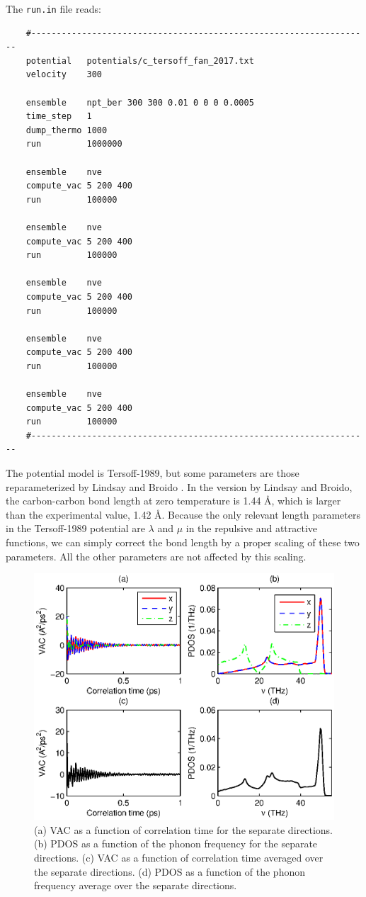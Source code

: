\documentclass[12pt,a4paper]{report}
\begin{document}
The \verb"run.in" file reads:
\begin{verbatim}
    #-------------------------------------------------------------------
    potential   potentials/c_tersoff_fan_2017.txt
    velocity    300

    ensemble    npt_ber 300 300 0.01 0 0 0 0.0005
    time_step   1
    dump_thermo 1000
    run         1000000

    ensemble    nve
    compute_vac 5 200 400
    run         100000

    ensemble    nve
    compute_vac 5 200 400
    run         100000

    ensemble    nve
    compute_vac 5 200 400
    run         100000

    ensemble    nve
    compute_vac 5 200 400
    run         100000

    ensemble    nve
    compute_vac 5 200 400
    run         100000
    #-------------------------------------------------------------------
\end{verbatim}

The potential model is Tersoff-1989, but some parameters are those reparameterized by Lindsay and Broido \cite{lindsay2010prb}. In the version by Lindsay and Broido, the carbon-carbon bond length at zero temperature is 1.44 \AA, which is larger than the experimental value, 1.42 \AA. Because the only relevant length parameters in the Tersoff-1989 potential are $\lambda$ and $\mu$ in the repulsive and attractive functions, we can simply correct the bond length by a proper scaling of these two parameters. All the other parameters are not affected by this scaling.

\begin{figure}[ht]
\begin{center}
\includegraphics[width=\columnwidth]{ex2.eps}
\caption{(a) VAC as a function of correlation time for the separate directions.
(b) PDOS as a function of the phonon frequency for the separate directions.
(c) VAC as a function of correlation time averaged over the separate directions.
(d) PDOS as a function of the phonon frequency average over the separate directions.}
\label{figure:graphene_vac_dos}
\end{center}
\end{figure}
\end{document}
